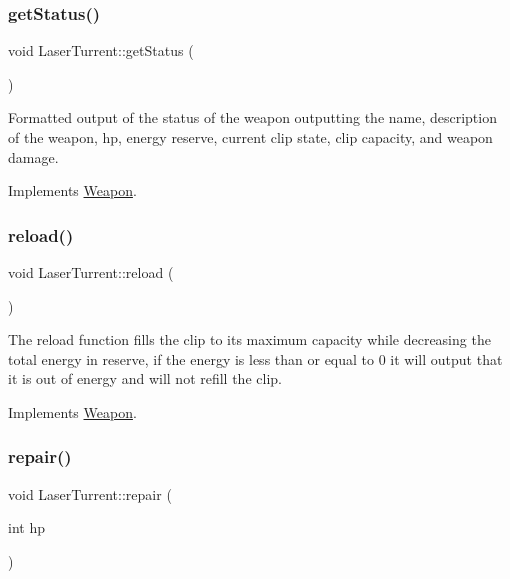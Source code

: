 \subsubsection{\texorpdfstring{get\+Status()}{getStatus()}}
{\footnotesize\ttfamily void Laser\+Turrent\+::get\+Status (\begin{DoxyParamCaption}{ }\end{DoxyParamCaption})\hspace{0.3cm}{\ttfamily [virtual]}}

Formatted output of the status of the weapon outputting the name, description of the weapon, hp, energy reserve, current clip state, clip capacity, and weapon damage. 

Implements \hyperlink{classWeapon}{Weapon}.

\mbox{\label{classLaserTurrent_a32707d7fea4474e0dabf6508adbb3f5b}} 
\subsubsection{\texorpdfstring{reload()}{reload()}}
{\footnotesize\ttfamily void Laser\+Turrent\+::reload (\begin{DoxyParamCaption}{ }\end{DoxyParamCaption})\hspace{0.3cm}{\ttfamily [virtual]}}

The reload function fills the clip to its maximum capacity while decreasing the total energy in reserve, if the energy is less than or equal to 0 it will output that it is out of energy and will not refill the clip. 

Implements \hyperlink{classWeapon}{Weapon}.

\mbox{\label{classLaserTurrent_a8cb483c6f5659ebca912c8e0cb5ba1f2}} 
\subsubsection{\texorpdfstring{repair()}{repair()}}
{\footnotesize\ttfamily void Laser\+Turrent\+::repair (\begin{DoxyParamCaption}\item[{int}]{hp }\end{DoxyParamCaption})\hspace{0.3cm}{\ttfamily [virtual]}}


